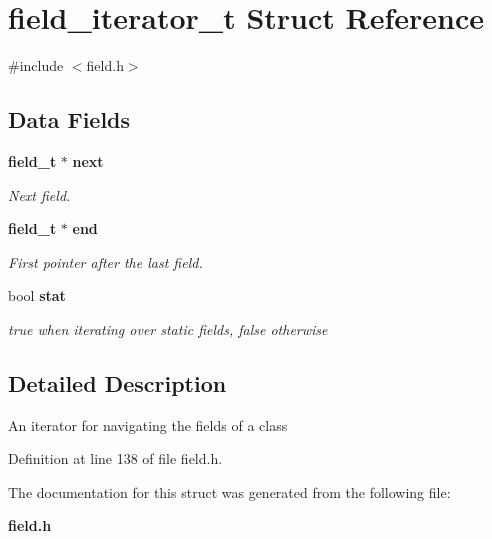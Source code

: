 \section{field\_\-iterator\_\-t Struct Reference}
\label{structfield__iterator__t}


{\ttfamily \#include $<$field.h$>$}

\subsection*{Data Fields}
\begin{DoxyCompactItemize}
\item 
{\bf field\_\-t} $\ast$ {\bf next}\label{structfield__iterator__t_ac9d28bb93ebe1d10a9520f89625ecab1}

\begin{DoxyCompactList}\small\item\em Next field. \item\end{DoxyCompactList}\item 
{\bf field\_\-t} $\ast$ {\bf end}\label{structfield__iterator__t_a697ad4aa131b31171a3a9ae7408b2701}

\begin{DoxyCompactList}\small\item\em First pointer after the last field. \item\end{DoxyCompactList}\item 
bool {\bf stat}\label{structfield__iterator__t_abdc97b870f2961808c074dc81ac6758c}

\begin{DoxyCompactList}\small\item\em true when iterating over static fields, false otherwise \item\end{DoxyCompactList}\end{DoxyCompactItemize}


\subsection{Detailed Description}
An iterator for navigating the fields of a class 

Definition at line 138 of file field.h.



The documentation for this struct was generated from the following file:\begin{DoxyCompactItemize}
\item 
{\bf field.h}\end{DoxyCompactItemize}
